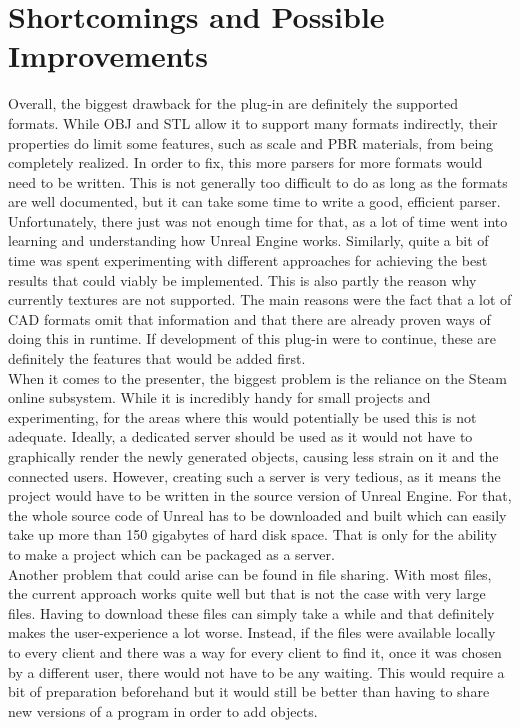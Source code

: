\section{Shortcomings and Possible Improvements}

Overall, the biggest drawback for the plug-in are definitely the supported formats. While OBJ and STL allow it to support many formats indirectly, their properties do limit some features, such as scale and \acs{PBR} materials, from being completely realized. In order to fix, this more parsers for more formats would need to be written. This is not generally too difficult to do as long as the formats are well documented, but it can take some time to write a good, efficient parser. Unfortunately, there just was not enough time for that, as a lot of time went into learning and understanding how Unreal Engine works. Similarly, quite a bit of time was spent experimenting with different approaches for achieving the best results that could viably be implemented. This is also partly the reason why currently textures are not supported. The main reasons were the fact that a lot of \acs{CAD} formats omit that information and that there are already proven ways of doing this in runtime\cite{bib:RunTex}. If development of this plug-in were to continue, these are definitely the features that would be added first.\\
When it comes to the presenter, the biggest problem is the reliance on the Steam online subsystem. While it is incredibly handy for small projects and experimenting, for the areas where this would potentially be used this is not adequate. Ideally, a dedicated server should be used as it would not have to graphically render the newly generated objects, causing less strain on it and the connected users. However, creating such a server is very tedious, as it means the project would have to be written in the source version of Unreal Engine. For that, the whole source code of Unreal has to be downloaded and built which can easily take up more than 150 gigabytes of hard disk space. That is only for the ability to make a project which can be packaged as a server.\\ 
Another problem that could arise can be found in file sharing. With most files, the current approach works quite well but that is not the case with very large files. Having to download these files can simply take a while and that definitely makes the user-experience a lot worse. Instead, if the files were available locally to every client and there was a way for every client to find it, once it was chosen by a different user, there would not have to be any waiting. This would require a bit of preparation beforehand but it would still be better than having to share new versions of a program in order to add objects.\\